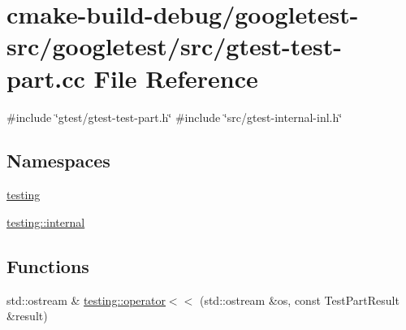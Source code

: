 \hypertarget{gtest-test-part_8cc}{}\section{cmake-\/build-\/debug/googletest-\/src/googletest/src/gtest-\/test-\/part.cc File Reference}
\label{gtest-test-part_8cc}
{\ttfamily \#include \char`\"{}gtest/gtest-\/test-\/part.\+h\char`\"{}}\newline
{\ttfamily \#include \char`\"{}src/gtest-\/internal-\/inl.\+h\char`\"{}}\newline
\subsection*{Namespaces}
\begin{DoxyCompactItemize}
\item 
 \mbox{\hyperlink{namespacetesting}{testing}}
\item 
 \mbox{\hyperlink{namespacetesting_1_1internal}{testing\+::internal}}
\end{DoxyCompactItemize}
\subsection*{Functions}
\begin{DoxyCompactItemize}
\item 
std\+::ostream \& \mbox{\hyperlink{namespacetesting_a266e39b7c4691fedb856047673a412d8}{testing\+::operator$<$$<$}} (std\+::ostream \&os, const Test\+Part\+Result \&result)
\end{DoxyCompactItemize}
